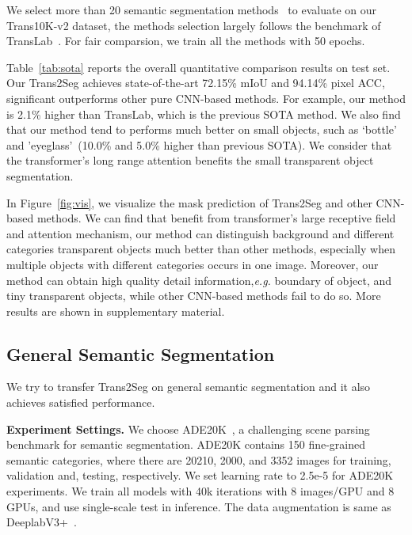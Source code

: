 \documentclass{article}
\begin{document}
We select more than 20 semantic segmentation methods~\cite{translab,deeplabv3+,dabnet,pspnet,ocnet,denseaspp,fcn,unet,bisenet,refinenet,hardnet,hrnet,fastscnn,contextnet,lednet,dunet,icnet,dabnet,fpenet,dfanet,danet,espnetv2} to evaluate on our Trans10K-v2 dataset, the methods selection largely follows the benchmark of TransLab~\cite{translab}. For fair comparsion, we train all the methods with 50 epochs.



Table~\ref{tab:sota} reports the overall quantitative comparison results on test set.
Our Trans2Seg achieves state-of-the-art 72.15\% mIoU and 94.14\% pixel ACC, significant outperforms other pure CNN-based methods. For example, our method is 2.1\% higher than TransLab, which is the previous SOTA method. We also find that our method tend to performs much better on small objects, such as `bottle' and 'eyeglass'~(10.0\% and 5.0\% higher than previous SOTA). We consider that the transformer's long range attention benefits the small transparent object segmentation.

In Figure~\ref{fig:vis}, we visualize the mask prediction of Trans2Seg and other CNN-based methods. We can find that benefit from transformer's large receptive field and attention mechanism, our method can distinguish background and different categories transparent objects much better than other methods, especially when multiple objects with different categories occurs in one image.
Moreover, our method can obtain high quality detail information,\textit{e.g.} boundary of object, and tiny transparent objects, while other CNN-based methods fail to do so. More results are shown in supplementary material.

\subsection{General Semantic Segmentation}
We try to transfer Trans2Seg on general semantic segmentation and it also achieves satisfied performance.

\textbf{Experiment Settings.}
We choose ADE20K~\cite{zhou2017scene}, a challenging scene parsing benchmark for semantic segmentation. ADE20K contains 150 fine-grained semantic categories, where there are 20210, 2000, and 3352 images for training, validation and, testing, respectively. We set learning rate to 2.5e-5 for ADE20K experiments. We train all models with 40k iterations with 8 images/GPU and 8 GPUs, and use single-scale test in inference. The data augmentation is same as DeeplabV3+~\cite{deeplabv3+}. 
\end{document}
